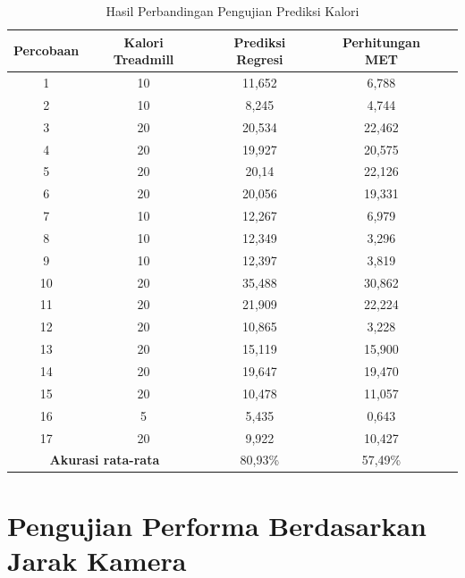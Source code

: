 \begin{longtable}{|c|c|c|c|c|}
  \caption{Hasil Perbandingan Pengujian Prediksi Kalori}
  \label{tb:PengujianPrediksi}                                   \\
  \hline
  \rowcolor[HTML]{C0C0C0}
  \textbf{Percobaan} & \textbf{Kalori Treadmill} & \textbf{Prediksi Regresi} & \textbf{Perhitungan MET} \\
  \hline
  1   & 10    & 11,652    & 6,788   \\
  \hline
  2   & 10    & 8,245     & 4,744   \\
  \hline
  3   & 20    & 20,534    & 22,462   \\
  \hline
  4   & 20    & 19,927    & 20,575   \\
  \hline
  5   & 20    & 20,14     & 22,126   \\
  \hline
  6   & 20    & 20,056    & 19,331   \\
  \hline
  7   & 10    & 12,267    & 6,979  \\
  \hline
  8   & 10    & 12,349    & 3,296  \\
  \hline
  9   & 10    & 12,397    & 3,819  \\
  \hline
  10   & 20   & 35,488    & 30,862  \\
  \hline
  11   & 20   & 21,909    & 22,224  \\
  \hline
  12   & 20   & 10,865    & 3,228  \\
  \hline
  13   & 20   & 15,119    & 15,900  \\
  \hline
  14   & 20   & 19,647    & 19,470  \\
  \hline
  15   & 20   & 10,478    & 11,057  \\
  \hline
  16   & 5    & 5,435     & 0,643  \\
  \hline
  17   & 20   & 9,922     & 10,427  \\
  \hline

  \multicolumn{2}{|c|}{\textbf{Akurasi rata-rata}} & 80,93\% & 57,49\% \\
  \hline
\end{longtable}


\section{Pengujian Performa Berdasarkan Jarak Kamera}
\label{sec:PengujianJarak}

